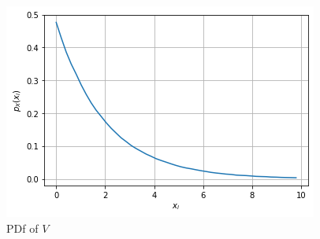 \begin{enumerate}[label=\thesubsection.\arabic*.,ref=\thesubsection.\theenumi]
\begin{figure}[!ht]
\includegraphics[width=\columnwidth]{figs/trans/6.1.1 PDf.png}
\caption{PDf of $V$}
\label{fig:probman_trans_PDf_V}
\end{figure}


\end{enumerate}
